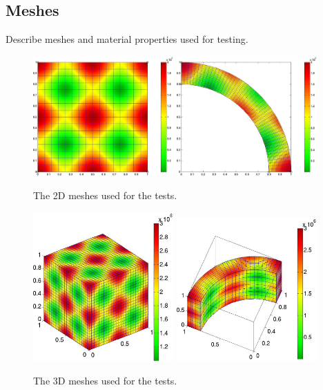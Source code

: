 
\subsection{Meshes}

Describe meshes and material properties used for testing.

\begin{figure}
	\includegraphics[width=0.48\textwidth]{figs/box}
	\includegraphics[width=0.48\textwidth]{figs/fan}
	\caption{\label{fig:mesh2d} The 2D meshes used for the tests.}
\end{figure}

\begin{figure}
	\includegraphics[width=0.48\textwidth]{figs/box3a}
	\includegraphics[width=0.48\textwidth]{figs/fan3a}
	\caption{\label{fig:mesh3d} The 3D meshes used for the tests.}
\end{figure}


